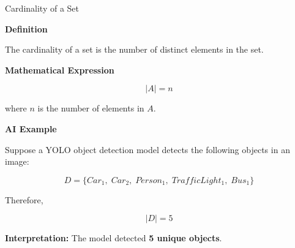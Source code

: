 \documentclass[aspectratio=169]{beamer}
\begin{document}
\begin{frame}{Cardinality of a Set}

\textbf{Definition}

The cardinality of a set is the number of distinct elements in the set.

\vspace{0.3cm}

\textbf{Mathematical Expression}

\[
|A|=n
\]

where \(n\) is the number of elements in \(A\).

\vspace{0.4cm}

\textbf{AI Example}

Suppose a YOLO object detection model detects the following objects in an image:

\[
D=
\{
Car_1,\;
Car_2,\;
Person_1,\;
TrafficLight_1,\;
Bus_1
\}
\]

Therefore,

\[
|D|=5
\]

\textbf{Interpretation:} The model detected \textbf{5 unique objects}.

\end{frame}
\end{document}

